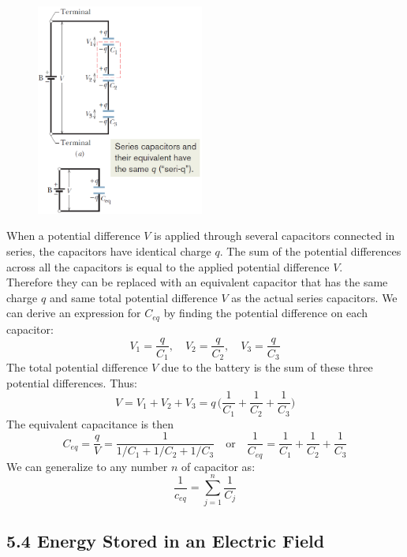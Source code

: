 \documentclass[12pt, a4paper]{article}
\begin{document}
		\begin{figure}
			\centering
			\includegraphics[width=5.5cm]{Physics2_PNGs/series-capacitors.png}
			\caption*{}
			\label{fig:series-capacitors.png}
		\end{figure}
		When a potential difference $V$ is applied through several capacitors connected in series, the capacitors have identical charge $q$. The sum of the potential differences across all the capacitors is equal to the applied potential difference $V$. \\
		Therefore they can be replaced with an equivalent capacitor that has the same charge $q$ and same total potential difference $V$ as the actual series capacitors.
		We can derive an expression for $C_{eq}$ by finding the potential difference on each capacitor:
		\[
			V_1 = \frac{q}{C_1}, \quad V_2 = \frac{q}{C_2}, \quad V_3 = \frac{q}{C_3}
		\]
		The total potential difference $V$ due to the battery is the sum  of these three potential differences. Thus:
		\[
			V = V_1 + V_2 + V_3 = q \, \biggl( 
				\frac{1}{C_1} + \frac{1}{C_2} + \frac{1}{C_3} \biggl)
		\]
		The equivalent capacitance is then
		\[
			C_{eq} = \frac{q}{V} = \frac{1}{1/C_1 + 1/C_2 + 1/C_3}
			\quad \text{or} \quad
			\frac{1}{C_{eq}} = \frac{1}{C_1} + \frac{1}{C_2} + \frac{1}{C_3}	
		\]
		We can generalize to any number $n$ of capacitor as:
		\begin{equation*}
			\frac{1}{c_{eq}} = \sum_{j=1}^{n} \frac{1}{C_j}
			\tag{$n$ Capacitors in Serier, 5-19}
		\end{equation*}
		
		
		
		\subsection*{5.4 Energy Stored in an Electric Field}
\end{document}
